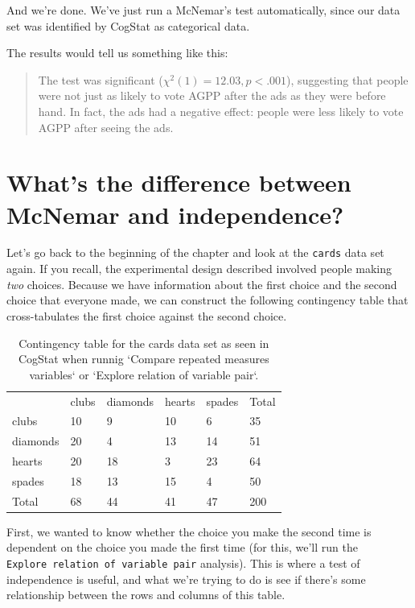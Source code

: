 \documentclass[
  11pt,
  a4paper,
  twoside,symmetric,openright]{book}
\theoremstyle{break}
\theoremstyle{break}
\begin{document}
And we're done. We've just run a McNemar's test automatically, since our data set was identified by CogStat as categorical data.

The results would tell us something like this:

\begin{quote}
The test was significant (\(\chi^2(1) = 12.03, p<.001\)), suggesting that people were not just as likely to vote AGPP after the ads as they were before hand. In fact, the ads had a negative effect: people were less likely to vote AGPP after seeing the ads.
\end{quote}

\section{What's the difference between McNemar and independence?}\label{whats-the-difference-between-mcnemar-and-independence}

Let's go back to the beginning of the chapter and look at the \texttt{cards} data set again. If you recall, the experimental design described involved people making \emph{two} choices. Because we have information about the first choice and the second choice that everyone made, we can construct the following contingency table that cross-tabulates the first choice against the second choice.

\begin{table}[!h]

\caption{\label{tab:unnamed-chunk-53}Contingency table for the cards data set as seen in CogStat when runnig `Compare repeated measures variables` or `Explore relation of variable pair`.}
\centering
\begin{tabular}[t]{llllll}
\toprule
 & clubs & diamonds & hearts & spades & Total\\
clubs & 10 & 9 & 10 & 6 & 35\\
diamonds & 20 & 4 & 13 & 14 & 51\\
hearts & 20 & 18 & 3 & 23 & 64\\
spades & 18 & 13 & 15 & 4 & 50\\
Total & 68 & 44 & 41 & 47 & 200\\
\bottomrule
\end{tabular}
\end{table}

First, we wanted to know whether the choice you make the second time is dependent on the choice you made the first time (for this, we'll run the \texttt{Explore\ relation\ of\ variable\ pair} analysis). This is where a test of independence is useful, and what we're trying to do is see if there's some relationship between the rows and columns of this table.
\end{document}
